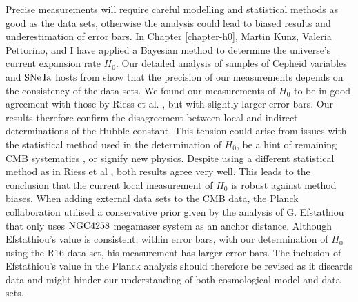 Precise measurements will require careful modelling and statistical methods as good as the data sets, otherwise the analysis could lead to biased results and underestimation of error bars. In Chapter \ref{chapter-h0}, Martin Kunz, Valeria Pettorino, and I have applied a Bayesian method to determine the universe's current expansion rate $H_0$. Our  detailed analysis of samples of Cepheid variables and $\mathrm{SNe\,Ia}$ hosts from \cite{Riess:2011yx,Riess:2016jrr} show that the precision of our measurements depends on the consistency of the data sets. We found our measurements of $H_0$ to be in good agreement with those by Riess et al. \cite{Riess:2011yx,Riess:2016jrr}, but with slightly larger error bars. Our results therefore confirm the disagreement between local and indirect determinations of the Hubble constant. This tension could arise from issues with the statistical method used in the determination of $H_0$, be a hint of remaining CMB systematics \cite{Riess:2016jrr}, or signify new physics. Despite using a different statistical method as in Riess et al \cite{Riess:2016jrr}, both results agree very well. This leads to the conclusion that the current local measurement of $H_0$ is robust against method biases.
When adding external data sets to the CMB data, the Planck collaboration utilised a conservative prior given by the analysis of G. Efstathiou \cite{Efstathiou:2013via} that only uses $\mathrm{NGC4258}$ megamaser system as an anchor distance. Although Efstathiou's value is consistent, within error bars, with our determination of $H_0$ using the R16 data set, his measurement has larger error bars. The inclusion of Efstathiou's value in the Planck analysis should therefore be revised as it discards data and might hinder our understanding of both cosmological model and data sets.        

